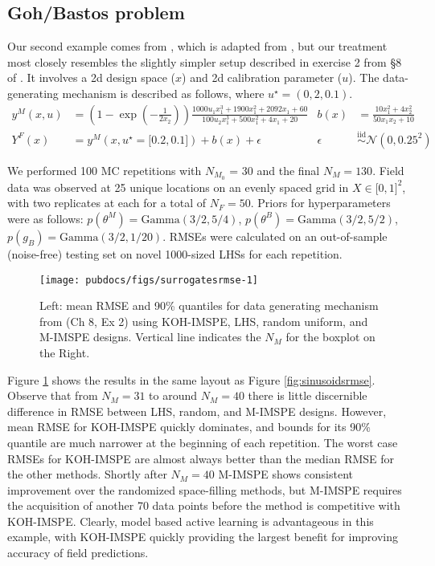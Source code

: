 \documentclass[
]{article}
\begin{document}
\hypertarget{gohbastos-problem}{%
\subsection{Goh/Bastos problem}\label{gohbastos-problem}}

Our second example comes from \citet{goh2013prediction}, which is adapted from \citet{bastos2009diagnostics}, but our treatment most closely resembles the slightly simpler setup described in exercise 2 from \S8 of \citet{gramacy2020surrogates}.
It involves a 2d design space (\(x\)) and 2d calibration parameter (\(u\)).
The data-generating mechanism is described as follows, where \(u^\star = (0,2, 0.1)\).
\begin{align*}
y^M(x,u) &= \left(1-\exp\left(-\frac{1}{2x_2}\right)\right)\frac{1000 u_1 x_1^3 + 1900 x_1^2 + 2092 x_1 + 60}{100 u_2 x_1^3 + 500 x_1^2 + 4x_1 + 20} &
b(x) &= \frac{10x_1^2 + 4x_2^2}{50x_1x_2 + 10}  \\
Y^F(x) &= y^M \left( x, u^\star = \lbrack 0.2, 0.1 \rbrack\right) + b(x) + \epsilon & \epsilon &\stackrel{\mathrm{iid}}{\sim} \mathcal{N}(0, 0.25^2)
\end{align*}

We performed 100 MC repetitions with \(N_{M_0}\) = 30 and the final \(N_M = 130\). Field data was observed at 25 unique locations on an evenly spaced grid in \(X\in\lbrack 0 , 1\rbrack ^2\), with two replicates at each for a total of \(N_F = 50\). Priors for hyperparameters were as follows: \(p(\theta^M) = \mathrm{Gamma}(3/2, 5/4)\),
\(p(\theta^B) = \mathrm{Gamma}(3/2, 5/2)\),
\(p(g_B) = \mathrm{Gamma}(3/2,1/20)\). RMSEs were calculated
on an out-of-sample (noise-free) testing set on novel 1000-sized
LHSs for each repetition.



\begin{figure}[ht!]
\texttt{[image: pubdocs/figs/surrogatesrmse-1]} \caption{Left: mean RMSE and 90\% quantiles for data generating mechanism from \citet{gramacy2020surrogates} (Ch 8, Ex 2) using KOH-IMSPE, LHS, random uniform, and M-IMSPE designs. Vertical line indicates the \(N_M\) for the boxplot on the Right.}\label{fig:surrogatesrmse}
\end{figure}

Figure \ref{fig:surrogatesrmse} shows the results in the same layout as Figure \ref{fig:sinusoidsrmse}. Observe that from \(N_M = 31\) to around \(N_M = 40\) there is little discernible difference in RMSE between LHS, random, and M-IMSPE designs. However, mean RMSE for KOH-IMSPE quickly dominates, and bounds for its 90\% quantile are much narrower at the beginning of each repetition.
The worst case RMSEs for KOH-IMSPE are almost always better than the median RMSE for the other methods. Shortly after \(N_M = 40\) M-IMSPE shows consistent improvement over the randomized space-filling methods, but M-IMSPE requires the acquisition of another 70 data points before the method is competitive with KOH-IMSPE. Clearly, model based active learning is advantageous in this example, with KOH-IMSPE quickly providing the largest benefit for improving accuracy of field predictions.
\end{document}
